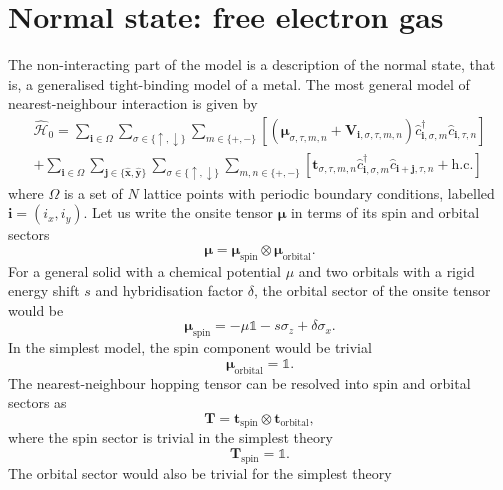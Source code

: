 \section{Normal state: free electron gas}
\label{sec:general_normal_state}
The non-interacting part of the model is a description of the normal state, that is, a generalised tight-binding model of a metal. The most general model of nearest-neighbour interaction is given by
\begin{multline}
\hat{\mathcal H}_0 = \sum_{\mathbf{i}\in\Omega}\sum_{\sigma\in\{\uparrow,\downarrow\}}\sum_{m\in\{+,-\}}
\left[
(\bm{\mu}_{\sigma, \tau, m, n} + \bm{V}_{\mathbf{i},\sigma, \tau, m, n} ) \hat c_{\mathbf{i}, \sigma, m}^\dagger \hat c_{\mathbf{i}, \tau, n} 
\right]\\
+\sum_{\mathbf{i}\in\Omega}\sum_{\mathbf{j}\in\{\hat{\mathbf{x}},\hat{\mathbf{y}}\}}\sum_{\sigma\in\{\uparrow,\downarrow\}}\sum_{m,n\in\{+,-\}}
\left[
\bm{t}_{\sigma, \tau, m, n} \hat c_{\mathbf{i}, \sigma, m}^\dagger \hat c_{\mathbf{i}+\mathbf{j}, \tau, n} +\text{h.c.}
\right]
\label{eq:normal_state_Hamiltonian}
\end{multline}
where $\Omega$ is a set of $N$ lattice points with periodic boundary conditions, labelled $\mathbf{i}=(i_x, i_y)$. Let us write the onsite tensor $\bm{\mu}$ in terms of its spin and orbital sectors
\begin{equation}
\bm{\mu}=\bm{\mu}_\text{spin}\otimes\bm{\mu}_\text{orbital}.
\end{equation}
For a general solid with a chemical potential $\mu$ and two orbitals with a rigid energy shift $s$ and hybridisation factor $\delta$, the orbital sector of the onsite tensor would be
\begin{equation}
\bm{\mu}_\text{spin} = -\mu\mathbb{1} - s\sigma_z + \delta \sigma_x.
\end{equation}
In the simplest model, the spin component would be trivial
\begin{equation}
\bm{\mu}_\text{orbital}=\mathbb{1}.
\end{equation}
The nearest-neighbour hopping tensor can be resolved into spin and orbital sectors as
\begin{equation}
\bm{T}=\bm{t}_\text{spin}\otimes\bm{t}_\text{orbital},
\end{equation}
where the spin sector is trivial in the simplest theory
\begin{equation}
\bm{T}_\text{spin}= \mathbb{1}.
\end{equation} The orbital sector would also be trivial for the simplest theory
